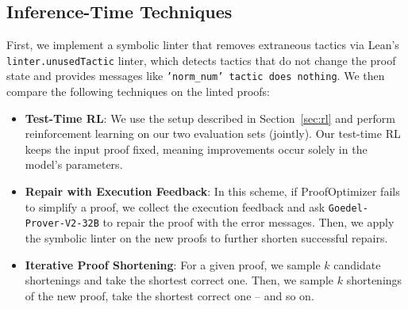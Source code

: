 \subsection{Inference-Time Techniques} \label{subsec:inference-time-algorithms}
First, we implement a symbolic linter that removes extraneous tactics via Lean's \texttt{linter.unusedTactic} linter, which detects tactics that do not change the proof state and provides messages like \texttt{'norm\_num' tactic does nothing}. We then compare the following techniques on the linted proofs:

\begin{itemize}[topsep=0pt, partopsep=0pt, leftmargin=0.7cm]
\itemsep1pt
\item \textbf{Test-Time RL}: We use the setup described in Section~\ref{sec:rl} and perform reinforcement learning on our two evaluation sets (jointly). Our test-time RL keeps the input proof fixed, meaning improvements occur solely in the model’s parameters.

\item \textbf{Repair with Execution Feedback}: In this scheme, if ProofOptimizer fails to simplify a proof, we collect the execution feedback and ask \texttt{Goedel-Prover-V2-32B} to repair the proof with the error messages. Then, we apply the symbolic linter on the new proofs to further shorten successful repairs.

\item \textbf{Iterative Proof Shortening}: For a given proof, we sample $k$ candidate shortenings and take the shortest correct one. Then, we sample $k$ shortenings of the new proof, take the shortest correct one -- and so on.
\end{itemize}
